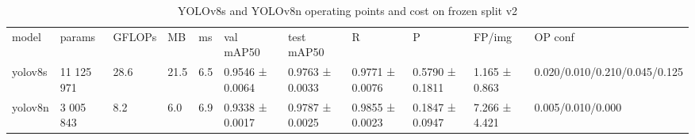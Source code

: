 \begin{table}[t]\centering\small\caption{YOLOv8s and YOLOv8n operating points and cost on frozen split v2}
\label{tab:t2yolosize}
\begin{tabular}{|lllllllllll|}\hline
model & params & GFLOPs & MB & ms & val mAP50 & test mAP50 & R & P & FP/img & OP conf\\
yolov8s & 11 125 971 & 28.6 & 21.5 & 6.5 & 0.9546 ± 0.0064 & 0.9763 ± 0.0033 & 0.9771 ± 0.0076 & 0.5790 ± 0.1811 & 1.165 ± 0.863 & 0.020/0.010/0.210/0.045/0.125\\
yolov8n & 3 005 843 & 8.2 & 6.0 & 6.9 & 0.9338 ± 0.0017 & 0.9787 ± 0.0025 & 0.9855 ± 0.0023 & 0.1847 ± 0.0947 & 7.266 ± 4.421 & 0.005/0.010/0.000\\
\hline\end{tabular}\end{table}
